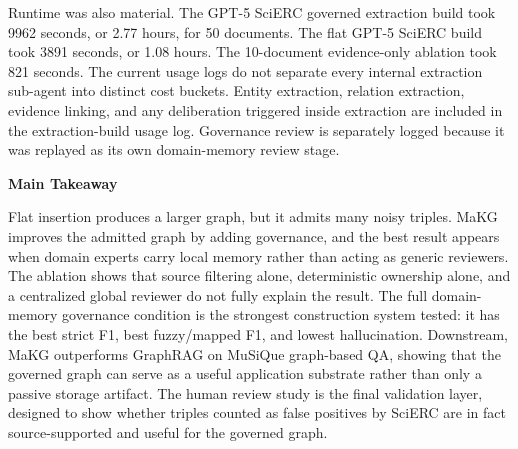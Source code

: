 Runtime was also material. The GPT-5 SciERC governed extraction build
took 9962 seconds, or 2.77 hours, for 50 documents. The flat GPT-5
SciERC build took 3891 seconds, or 1.08 hours. The 10-document
evidence-only ablation took 821 seconds. The current usage logs do not
separate every internal extraction sub-agent into distinct cost buckets.
Entity extraction, relation extraction, evidence linking, and any
deliberation triggered inside extraction are included in the
extraction-build usage log. Governance review is separately logged
because it was replayed as its own domain-memory review stage.

\textbf{Main Takeaway}

Flat insertion produces a larger graph, but it admits many noisy
triples. MaKG improves the admitted graph by adding governance, and the
best result appears when domain experts carry local memory rather than
acting as generic reviewers. The ablation shows that source filtering
alone, deterministic ownership alone, and a centralized global reviewer
do not fully explain the result. The full domain-memory governance
condition is the strongest construction system tested: it has the best
strict F1, best fuzzy/mapped F1, and lowest hallucination. Downstream,
MaKG outperforms GraphRAG on MuSiQue graph-based QA, showing that the
governed graph can serve as a useful application substrate rather than
only a passive storage artifact. The human review study is the final
validation layer, designed to show whether triples counted as false
positives by SciERC are in fact source-supported and useful for the
governed graph.
